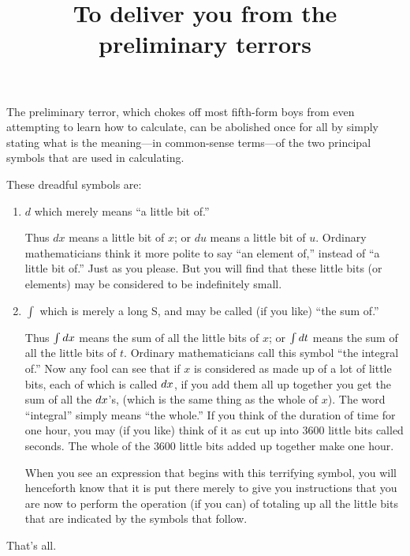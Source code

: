 \documentclass{ximera}
\title{To deliver you from the preliminary terrors}
\begin{document}
\begin{abstract}
\end{abstract}
\maketitle

The preliminary terror, which chokes off most fifth-form boys from
even attempting to learn how to calculate, can be abolished once for
all by simply stating what is the meaning---in common-sense terms---of the
two principal symbols that are used in calculating.

These dreadful symbols are:

\begin{enumerate}
\item $d$ which merely means ``a little bit of.''

Thus $dx$ means a little bit of $x$; or $du$ means a little bit of
$u$. Ordinary mathematicians think it more polite to say ``an element
of,'' instead of ``a little bit of.'' Just as you please. But you will
find that these little bits (or elements) may be considered to be
indefinitely small.

\item $\int$ which is merely a long S, and may be called (if you like)
  ``the sum of.''

Thus $\int \mathop{}\!d x$ means the sum of all the little bits of $x$; or $\int
\mathop{}\!d t$ means the sum of all the little bits of $t$. Ordinary
mathematicians call this symbol ``the integral of.'' Now any fool can
see that if $x$ is considered as made up of a lot of little bits, each
of which is called $\mathop{}\!d x$, if you add them all up together you get the
sum of all the $\mathop{}\!d x$'s, (which is the same thing as the whole of
$x$). The word ``integral'' simply means ``the whole.'' If you think
of the duration of time for one hour, you may (if you like) think of
it as cut up into $3600$ little bits called seconds. The whole of the
$3600$ little bits added up together make one hour.

When you see an expression that begins with this terrifying symbol,
you will henceforth know that it is put there merely to give you
instructions that you are now to perform the operation (if you can) of
totaling up all the little bits that are indicated by the symbols
that follow.
\end{enumerate}
That's all. 
\end{document}
